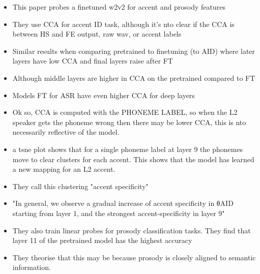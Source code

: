 \begin{itemize}
    \item This paper probes a finetuned w2v2 for accent and prosody features \cite{yang2023can}
    \item They use CCA for accent ID task, although it's nto clear if the CCA is between HS and FE output, raw wav, or accent labels
    \item Similar results when comparing pretrained to finetuning (to AID) where later layers have low CCA and final layers raise after FT
    \item Although middle layers are higher in CCA on the pretrained compared to FT
    \item Models FT for ASR have even higher CCA for deep layers
    \item Ok so, CCA is computed with the PHONEME LABEL, so when the L2 speaker gets the phoneme wrong then there may be lower CCA, this is nto necessarily reflective of the model.
    \item a tsne plot shows that for a single phoneme label at layer 9 the phonemes move to clear clusters for each accent. This shows that the model has learned a new mapping for an L2 accent.
    \item They call this clustering "accent specificity"
    \item "In general, we observe a gradual increase of accent specificity in θAID starting from layer 1, and the strongest accent-specificity in layer 9"
    \item They also train linear probes for prosody classification tasks. They find that layer 11 of the pretrained model has the highest accuracy
    \item They theorise that this may be because prosody is closely aligned to semantic information.
\end{itemize}


